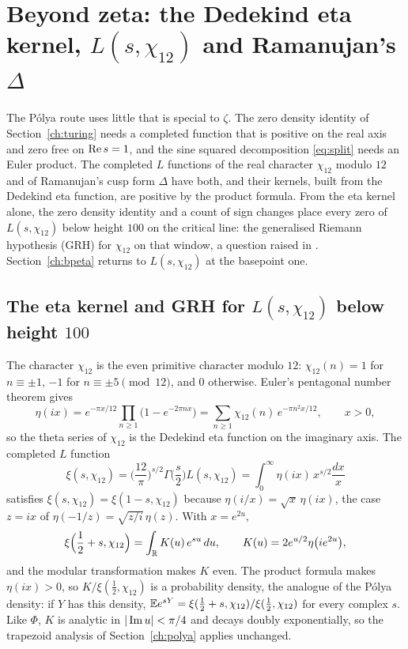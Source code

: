 \section{Beyond zeta: the Dedekind eta kernel, $L(s,\chi_{12})$ and Ramanujan's $\Delta$}\label{ch:chi12}

The P\'olya route uses little that is special to $\zeta$. The zero density identity of Section~\ref{ch:turing} needs a completed function that is positive on the real axis and zero free on $\operatorname{Re} s=1$, and the sine squared decomposition \eqref{eq:split} needs an Euler product. The completed $L$ functions of the real character $\chi_{12}$ modulo $12$ and of Ramanujan's cusp form $\Delta$ have both, and their kernels, built from the Dedekind eta function, are positive by the product formula. From the eta kernel alone, the zero density identity and a count of sign changes place every zero of $L(s,\chi_{12})$ below height $100$ on the critical line: the generalised Riemann hypothesis (GRH) for $\chi_{12}$ on that window, a question raised in \cite[Theorem 12]{P26eta}. Section~\ref{ch:bpeta} returns to $L(s,\chi_{12})$ at the basepoint one.

\subsection{The eta kernel and GRH for \texorpdfstring{$L(s,\chi_{12})$}{L(s,chi12)} below height \texorpdfstring{$100$}{100}}\label{sec:ch16:eta}

The character $\chi_{12}$ is the even primitive character modulo $12$: $\chi_{12}(n)=1$ for $n\equiv\pm1$, $-1$ for $n\equiv\pm5\pmod{12}$, and $0$ otherwise. Euler's pentagonal number theorem gives
\[
\eta(ix)=e^{-\pi x/12}\prod_{n\ge1}\big(1-e^{-2\pi nx}\big)=\sum_{n\ge1}\chi_{12}(n)\,e^{-\pi n^2x/12},\qquad x>0,
\]
so the theta series of $\chi_{12}$ is the Dedekind eta function on the imaginary axis. The completed $L$ function
\[
\xi(s,\chi_{12})=\Big(\frac{12}\pi\Big)^{s/2}\Gamma\Big(\frac s2\Big)L(s,\chi_{12})=\int_0^\infty\eta(ix)\,x^{s/2}\frac{dx}x
\]
satisfies $\xi(s,\chi_{12})=\xi(1-s,\chi_{12})$ because $\eta(i/x)=\sqrt x\,\eta(ix)$, the case $z=ix$ of $\eta(-1/z)=\sqrt{z/i}\,\eta(z)$. With $x=e^{2u}$,
\[
\xi\Big(\frac12+s,\chi_{12}\Big)=\int_{\mathbb{R}}K(u)\,e^{su}\,du,\qquad K(u)=2e^{u/2}\eta\big(ie^{2u}\big),
\]
and the modular transformation makes $K$ even. The product formula makes $\eta(ix)>0$, so $K/\xi(\frac12,\chi_{12})$ is a probability density, the analogue of the P\'olya density: if $Y$ has this density, $\mathbb{E} e^{sY}=\xi(\frac12+s,\chi_{12})/\xi(\frac12,\chi_{12})$ for every complex $s$. Like $\Phi$, $K$ is analytic in $|\operatorname{Im} u|<\pi/4$ and decays doubly exponentially, so the trapezoid analysis of Section~\ref{ch:polya} applies unchanged.

